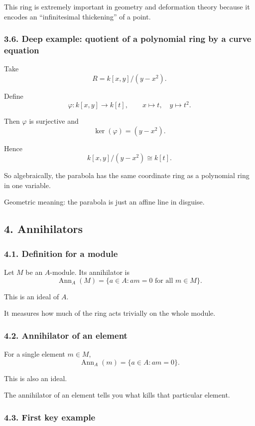 \documentclass[12pt,a4paper]{article}
\theoremstyle{plain}
\theoremstyle{definition}      %
\begin{document}
	This ring is extremely important in geometry and deformation theory because it encodes an ``infinitesimal thickening'' of a point.
	
	\subsubsection*{3.6. Deep example: quotient of a polynomial ring by a curve equation}
	
	Take
	\[
	R=k[x,y]/(y-x^2).
	\]
	
	Define
	\[
	\varphi:k[x,y]\to k[t],\qquad x\mapsto t,\quad y\mapsto t^2.
	\]
	
	Then \(\varphi\) is surjective and
	\[
	\ker(\varphi)=(y-x^2).
	\]
	
	Hence
	\[
	k[x,y]/(y-x^2)\cong k[t].
	\]
	
	So algebraically, the parabola has the same coordinate ring as a polynomial ring in one variable.
	
	Geometric meaning: the parabola is just an affine line in disguise.
	
	\subsection*{4. Annihilators}
	
	\subsubsection*{4.1. Definition for a module}
	
	Let \(M\) be an \(A\)-module. Its annihilator is
	\[
	\operatorname{Ann}_A(M)=\{a\in A:am=0\text{ for all }m\in M\}.
	\]
	
	This is an ideal of \(A\).
	
	It measures how much of the ring acts trivially on the whole module.
	
	\subsubsection*{4.2. Annihilator of an element}
	
	For a single element \(m\in M\),
	\[
	\operatorname{Ann}_A(m)=\{a\in A:am=0\}.
	\]
	
	This is also an ideal.
	
	The annihilator of an element tells you what kills that particular element.
	
	\subsubsection*{4.3. First key example}
	
\end{document}
